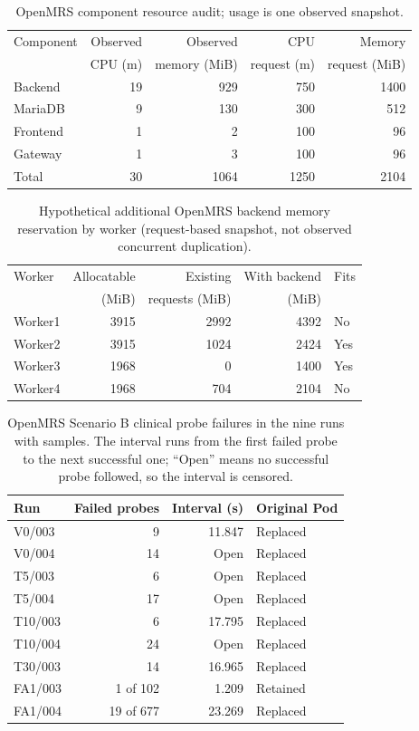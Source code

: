 \documentclass[10pt]{article}
\begin{document}
\begin{table}[h]
\centering
\caption{OpenMRS component resource audit; usage is one observed snapshot.\label{tab:openmrs-resources}}
\footnotesize
\setlength{\tabcolsep}{2.5pt}
\begin{tabular}{@{}lrrrr@{}}
\toprule Component & Observed & Observed & CPU & Memory\\
 & CPU (m) & memory (MiB) & request (m) & request (MiB)\\ \midrule
Backend & 19 & 929 & 750 & 1400\\
MariaDB & 9 & 130 & 300 & 512\\
Frontend & 1 & 2 & 100 & 96\\
Gateway & 1 & 3 & 100 & 96\\ \midrule
Total & 30 & 1064 & 1250 & 2104\\ \bottomrule
\end{tabular}
\end{table}

\begin{table}[h]
\centering
\caption{Hypothetical additional OpenMRS backend memory reservation by worker (request-based snapshot, not observed concurrent duplication).\label{tab:openmrs-worker-capacity}}
\footnotesize
\begin{tabular}{@{}lrrrl@{}}
\toprule Worker & Allocatable & Existing & With backend & Fits\\
 & (MiB) & requests (MiB) & (MiB) & \\ \midrule
Worker1 & 3915 & 2992 & 4392 & No\\
Worker2 & 3915 & 1024 & 2424 & Yes\\
Worker3 & 1968 & 0 & 1400 & Yes\\
Worker4 & 1968 & 704 & 2104 & No\\
\bottomrule
\end{tabular}
\end{table}

\begin{table}[h]
\centering
\caption{OpenMRS Scenario B clinical probe failures in the nine runs with samples. The interval runs from the first failed probe to the next successful one; ``Open'' means no successful probe followed, so the interval is censored.\label{tab:openmrs-clinical-episodes}}
\footnotesize
\begin{tabular}{@{}lrrl@{}}
\toprule
Run & Failed probes & Interval (s) & Original Pod\\ \midrule
V0/003 & 9 & 11.847 & Replaced\\
V0/004 & 14 & Open & Replaced\\
T5/003 & 6 & Open & Replaced\\
T5/004 & 17 & Open & Replaced\\
T10/003 & 6 & 17.795 & Replaced\\
T10/004 & 24 & Open & Replaced\\
T30/003 & 14 & 16.965 & Replaced\\
FA1/003 & 1 of 102 & 1.209 & Retained\\
FA1/004 & 19 of 677 & 23.269 & Replaced\\ \bottomrule
\end{tabular}
\end{table}
\end{document}
